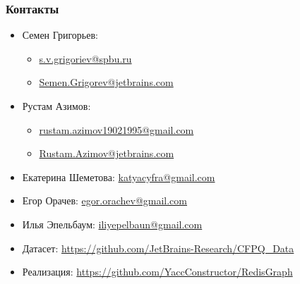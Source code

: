 \documentclass[xcolor=table,english,russian]{beamer}
\begin{document}
\begin{frame} \frametitle{Контакты}
    \begin{itemize}
        \item Семен Григорьев:
        \begin{itemize}
          \item \href{mailto:s.v.grigoriev@spbu.ru}{s.v.grigoriev@spbu.ru}
          \item \href{mailto:Semen.Grigorev@jetbrains.com}{Semen.Grigorev@jetbrains.com}
        \end{itemize}
        \item Рустам Азимов:
        \begin{itemize}
            \item \href{mailto:rustam.azimov19021995@gmail.com}{rustam.azimov19021995@gmail.com}
            \item \href{mailto:Rustam.Azimov@jetbrains.com}{Rustam.Azimov@jetbrains.com}
        \end{itemize}
        \item Екатерина Шеметова:  \href{mailto:katyacyfra@gmail.com}{katyacyfra@gmail.com}
        \item Егор Орачев: \href{mailto:egor.orachev@gmail.com}{egor.orachev@gmail.com}
        \item Илья Эпельбаум: \href{mailto:iliyepelbaun@gmail.com}{iliyepelbaun@gmail.com}
        \vspace{0.5cm}
        \item Датасет: \href{https://github.com/JetBrains-Research/CFPQ_Data}{https://github.com/JetBrains-Research/CFPQ\_Data}
        \item Реализация: \href{https://github.com/YaccConstructor/RedisGraph}{https://github.com/YaccConstructor/RedisGraph}
    \end{itemize}
    \vspace{0.1cm}
\end{frame}
\end{document}
